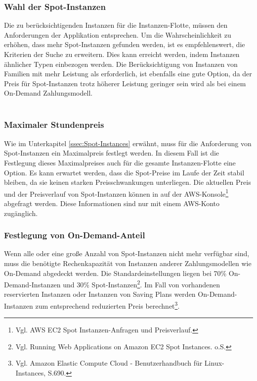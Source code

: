 \subsubsection*{Wahl der Spot-Instanzen}
Die zu berücksichtigenden Instanzen für die Instanzen-Flotte, müssen den Anforderungen der %
Applikation entsprechen. Um die Wahrscheinlichkeit zu erhöhen, dass mehr Spot-Instanzen gefunden werden, ist es empfehlenswert, die Kriterien der Suche zu erweitern. Dies kann erreicht werden, indem Instanzen ähnlicher Typen einbezogen werden. Die Berücksichtigung von Instanzen von Familien mit mehr Leistung als erforderlich, ist ebenfalls eine gute Option\cite{AMZ24}, da der Preis für Spot-Instanzen trotz höherer Leistung geringer sein wird als bei einem On-Demand Zahlungsmodell.
\\\\
\subsubsection*{Maximaler Stundenpreis}
Wie im Unterkapitel \ref{ssec:Spot-Instances} erwähnt, muss für die Anforderung von Spot-Instanzen ein Maximalpreis festlegt werden. In diesem Fall ist die Festlegung dieses Maximalpreises auch für die gesamte Instanzen-Flotte eine Option. Es kann erwartet werden, dass die Spot-Preise im Laufe der Zeit stabil bleiben, da sie keinen starken Preisschwankungen unterliegen. Die aktuellen Preis und der Preisverlauf von Spot-Instanzen können in auf der AWS-Konsole\footnote{Vgl. AWS EC2 Spot Instanzen-Anfragen und Preisverlauf\cite{AMZ25}.} abgefragt werden. Diese Informationen sind nur mit einem AWS-Konto zugänglich.

\subsubsection*{Festlegung von On-Demand-Anteil}
Wenn alle oder eine große Anzahl von Spot-Instanzen nicht mehr verfügbar sind, muss die benötigte Rechenkapazität von Instanzen anderer Zahlungsmodellen wie On-Demand abgedeckt werden. Die Standardeinstellungen liegen bei 70\% On-Demand-Instanzen und 30\% Spot-Instanzen\footnote{Vgl. Running Web Applications on Amazon EC2 Spot Instances. o.S.\cite{AMZ24}}. Im Fall von vorhandenen reservierten Instanzen oder Instanzen von Saving Plans werden On-Demand-Instanzen zum entsprechend reduzierten Preis berechnet\footnote{Vgl. Amazon Elastic Compute Cloud - Benutzerhandbuch für Linux-Instances, S.690\cite{AMZ26}.}.

